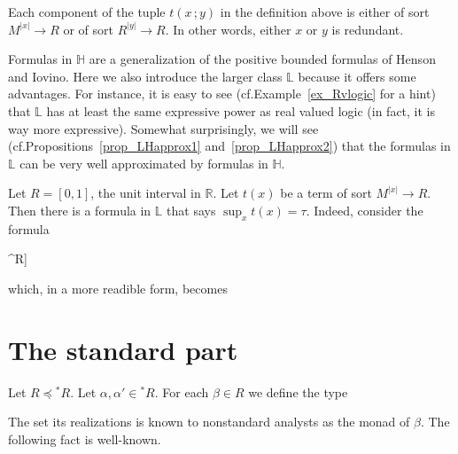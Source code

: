 \documentclass[11pt,oneside]{amsart}
\renewcommand*{\emph}[1]{%
   \smash{\tikz[baseline]\node[rectangle, fill=teal!25, rounded corners, inner xsep=0.5ex, inner ysep=0.2ex, anchor=base, minimum height = 2.7ex]{#1};}}
\begin{document}
\begin{remark}\label{rk_terms}
  Each component of the tuple $t(x\,;y)$ in the definition above is either of sort $M^{|x|}\to R$ or of sort $R^{|y|}\to R$.
  In other words, either $x$ or $y$ is redundant.
\end{remark}

\noindent\llap{\textcolor{red}{\Large\dangersign}\kern1ex}\ignorespaces
Formulas in $\mathds{H}$ are a generalization of the positive bounded formulas of Henson and Iovino.
Here we also introduce the larger class $\mathds{L}$ because it offers some advantages. 
For instance, it is easy to see (cf.\@ Example~\ref{ex_Rvlogic} for a hint) that $\mathds{L}$ has at least the same expressive power as real valued logic (in fact, it is way more expressive).
Somewhat surprisingly, we will see (cf.\@ Propositions~\ref{prop_LHapprox1} and~\ref{prop_LHapprox2}) that the formulas in $\mathds{L}$ can be very well approximated by formulas in $\mathds{H}$.

\begin{example}\label{ex_Rvlogic}
  Let $R=[0,1]$, the unit interval in $\mathds{R}$.
  Let $t(x)$ be a term of sort $M^{|x|}\to R$.
  Then there is a formula in $\mathds{L}$ that says $\sup_{x} t(x)=\tau$.
  Indeed, consider the formula

  {\wedge}{\forall^R\varepsilon \Big[\varepsilon\in\{0\}\ \vee\ \exists x\ \big[\tau\dotminus (t(x)+\varepsilon)\in\{0\}\big]\Big]}

  which, in a more readible form, becomes

\end{example}

\section{The standard part}

Let $R\preceq{}^*\!R$.
Let $\alpha,\alpha'\in{}^*\! R$.
For each $\beta\in R$ we define the type


The set its realizations is known to nonstandard analysts as the monad of $\beta$. 
The following fact is well-known.
\end{document}
